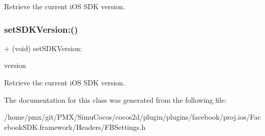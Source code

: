 Retrieve the current i\+OS S\+DK version. \mbox{\label{interfaceFBSettings_afd9810381ac6027e6400879cb68ba46e}} 
\subsubsection{\texorpdfstring{set\+S\+D\+K\+Version\+:()}{setSDKVersion:()}\hspace{0.1cm}{\footnotesize\ttfamily [5/5]}}
{\footnotesize\ttfamily + (void) set\+S\+D\+K\+Version\+: \begin{DoxyParamCaption}\item[{(N\+S\+String $\ast$)}]{version }\end{DoxyParamCaption}}

Retrieve the current i\+OS S\+DK version. 

The documentation for this class was generated from the following file\+:\begin{DoxyCompactItemize}
\item 
/home/pmx/git/\+P\+M\+X/\+Simu\+Cocos/cocos2d/plugin/plugins/facebook/proj.\+ios/\+Facebook\+S\+D\+K.\+framework/\+Headers/F\+B\+Settings.\+h\end{DoxyCompactItemize}
